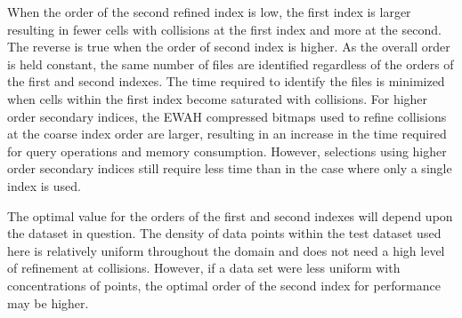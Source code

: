 \documentclass[apjl]{emulateapj}
\begin{document}
When the order of the second refined index is low, the first index is larger resulting in fewer cells with collisions at the first index and more at the second. The reverse is true when the order of second index is higher. As the overall order is held constant, the same number of files are identified regardless of the orders of the first and second indexes. The time required to identify the files is minimized when cells within the first index become saturated with collisions. For higher order secondary indices, the EWAH compressed bitmaps used to refine collisions at the coarse index order are larger, resulting in an increase in the time required for query operations and memory consumption. However, selections using higher order secondary indices still require less time than in the case where only a single index is used. 

The optimal value for the orders of the first and second indexes will depend upon the dataset in question. The density of data points within the test dataset used here is relatively uniform throughout the domain and does not need a high level of refinement at collisions. However, if a data set were less uniform with concentrations of points, the optimal order of the second index for performance may be higher.

\end{document}
